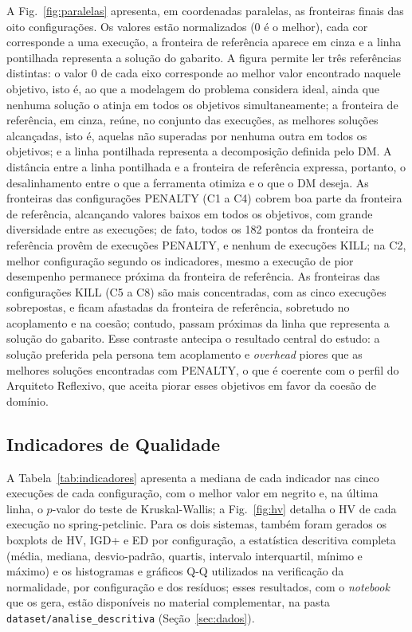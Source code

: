 \documentclass[conference]{IEEEtran}
\begin{document}
A Fig.~\ref{fig:paralelas} apresenta, em coordenadas paralelas, as fronteiras finais das oito configurações. Os valores estão normalizados (0 é o melhor), cada cor corresponde a uma execução, a fronteira de referência aparece em cinza e a linha pontilhada representa a solução do gabarito. A figura permite ler três referências distintas: o valor 0 de cada eixo corresponde ao melhor valor encontrado naquele objetivo, isto é, ao que a modelagem do problema considera ideal, ainda que nenhuma solução o atinja em todos os objetivos simultaneamente; a fronteira de referência, em cinza, reúne, no conjunto das execuções, as melhores soluções alcançadas, isto é, aquelas não superadas por nenhuma outra em todos os objetivos; e a linha pontilhada representa a decomposição definida pelo DM. A distância entre a linha pontilhada e a fronteira de referência expressa, portanto, o desalinhamento entre o que a ferramenta otimiza e o que o DM deseja. As fronteiras das configurações PENALTY (C1 a C4) cobrem boa parte da fronteira de referência, alcançando valores baixos em todos os objetivos, com grande diversidade entre as execuções; de fato, todos os 182 pontos da fronteira de referência provêm de execuções PENALTY, e nenhum de execuções KILL; na C2, melhor configuração segundo os indicadores, mesmo a execução de pior desempenho permanece próxima da fronteira de referência. As fronteiras das configurações KILL (C5 a C8) são mais concentradas, com as cinco execuções sobrepostas, e ficam afastadas da fronteira de referência, sobretudo no acoplamento e na coesão; contudo, passam próximas da linha que representa a solução do gabarito. Esse contraste antecipa o resultado central do estudo: a solução preferida pela persona tem acoplamento e \textit{overhead} piores que as melhores soluções encontradas com PENALTY, o que é coerente com o perfil do Arquiteto Reflexivo, que aceita piorar esses objetivos em favor da coesão de domínio.

\subsection{Indicadores de Qualidade}\label{sec:res_indicadores}

A Tabela~\ref{tab:indicadores} apresenta a mediana de cada indicador nas cinco execuções de cada configuração, com o melhor valor em negrito e, na última linha, o $p$-valor do teste de Kruskal-Wallis; a Fig.~\ref{fig:hv} detalha o HV de cada execução no spring-petclinic. Para os dois sistemas, também foram gerados os boxplots de HV, IGD+ e ED por configuração, a estatística descritiva completa (média, mediana, desvio-padrão, quartis, intervalo interquartil, mínimo e máximo) e os histogramas e gráficos Q-Q utilizados na verificação da normalidade, por configuração e dos resíduos; esses resultados, com o \textit{notebook} que os gera, estão disponíveis no material complementar, na pasta \texttt{dataset/analise\_descritiva} (Seção~\ref{sec:dados}).
\end{document}
